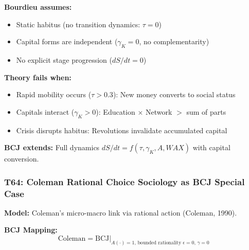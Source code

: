 \begin{tcolorbox}[colback=red!5!white, colframe=red!75!black,
    title=Boundary Condition: Where Bourdieu Fails]
\textbf{Bourdieu assumes:}
\begin{itemize}[nosep]
\item Static habitus (no transition dynamics: $\tau = 0$)
\item Capital forms are independent ($\gamma_{K} = 0$, no complementarity)
\item No explicit stage progression ($dS/dt = 0$)
\end{itemize}

\textbf{Theory fails when:}
\begin{itemize}[nosep]
\item Rapid mobility occurs ($\tau > 0.3$): New money converts to social status
\item Capitals interact ($\gamma_K > 0$): Education $\times$ Network $>$ sum of parts
\item Crisis disrupts habitus: Revolutions invalidate accumulated capital
\end{itemize}

\textbf{BCJ extends:} Full dynamics $dS/dt = f(\tau, \gamma_K, A, WAX)$ with capital conversion.
\end{tcolorbox}

\subsubsection*{T64: Coleman Rational Choice Sociology as BCJ Special Case}

\textbf{Model:} Coleman's micro-macro link via rational action (Coleman, 1990).

\textbf{BCJ Mapping:}
\begin{equation}
\text{Coleman} = \text{BCJ} \big|_{A(\cdot) = 1, \, \text{bounded rationality } \epsilon = 0, \, \gamma = 0}
\end{equation}

